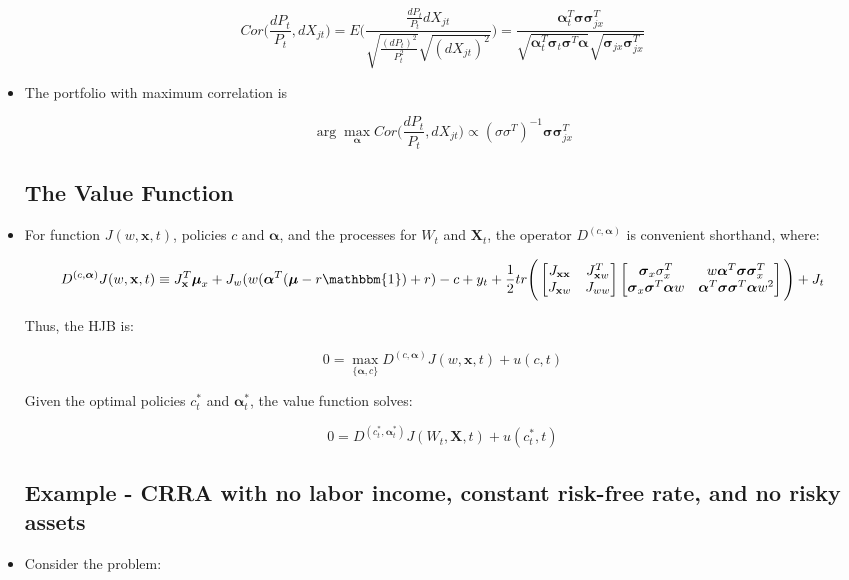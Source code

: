 \documentclass{article}
\newcommand{\xbf}{\mathbf{x}}
\newcommand{\Xbf}{\mathbf{X}}
\newcommand{\mubf}{\boldsymbol{\mu}}
\newcommand{\alphabf}{\boldsymbol{\alpha}}
\newcommand{\sigmabf}{\boldsymbol{\sigma}}
\newcommand{\onebf}{\mathbbm{1}}
\begin{document}
\begin{itemize}
$$
Cor\Bigg( \frac{dP_t}{P_t}, dX_{jt}\Bigg) 
= E\Bigg( \frac{\frac{dP_t}{P_t} dX_{jt}}{\sqrt{\frac{(dP_t)^2}{P_t^2}}\sqrt{(dX_{jt})^2}} \Bigg) 
= \frac{\alphabf_t^T \sigmabf \sigmabf_{jx}^T}{\sqrt{\alphabf_t^T \sigmabf_t \sigmabf^T \alphabf}\sqrt{\sigmabf_{jx} \sigmabf_{jx}^T}}
$$ 

\item The portfolio with maximum correlation is

$$
\arg \max_{\alphabf} Cor \Bigg( \frac{dP_t}{P_t}, dX_{jt}\Bigg) \propto ( \sigma \sigma^T)^{-1} \sigmabf \sigmabf_{jx}^T
$$

\subsection*{The Value Function}

\item For function $J(w, \xbf, t)$, policies $c$ and $\alphabf$, and the processes for $W_t$ and $\Xbf_t$, the operator $D^{(c, \alphabf)}$ is convenient shorthand, where:

$$
D^{(c, \alphabf)} J(w, \xbf, t) \equiv  J_\xbf^T \mubf_x + J_w (w(\alphabf^T(\mubf - r \onebf) + r) - c + y_t 
+ \frac{1}{2} tr \Bigg( 
\begin{bmatrix} J_{\xbf \xbf} & J_{\xbf w}^T  \\ J_{\xbf w} & J_{w w} \end{bmatrix}
\begin{bmatrix} \sigmabf_x \sigma_x^T & w \alphabf^T \sigmabf \sigmabf_x^T  \\ \sigmabf_x \sigmabf^T \alphabf  w & \alphabf^T \sigmabf \sigmabf^T \alphabf w^2 \end{bmatrix}
 \Bigg) + J_t
$$

Thus, the HJB is:

$$
0 = \max_{\{\alphabf, c\}} D^{(c, \alphabf)} J(w, \xbf, t) + u(c, t)
$$

Given the optimal policies $c_t^*$ and $\alphabf_t^*$, the value function solves:

$$
0 = D^{(c_t^*, \alphabf_t^*)} J(W_t, \Xbf, t) + u(c_t^*, t)
$$

\subsection*{Example - CRRA with no labor income, constant risk-free rate, and no risky assets}

\item Consider the problem:


\end{itemize}
\end{document}
